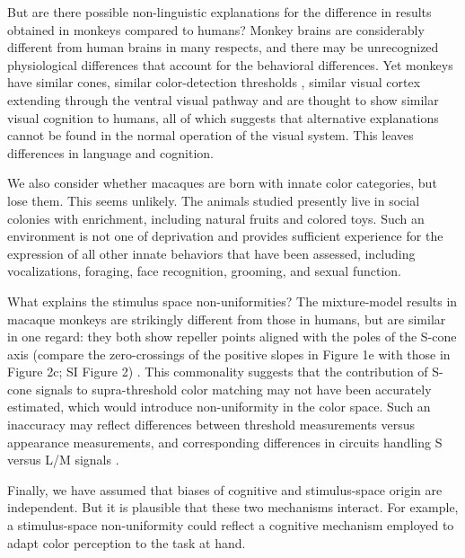 \documentclass[9pt,biorxiv,lineno,onehalfspacing]{lapreprint}
\begin{document}
\begin{refsection}
But are there possible non-linguistic explanations for the difference in results obtained in monkeys compared to humans? 
Monkey brains are considerably different from human brains in many respects, and there may be unrecognized physiological differences that account for the behavioral differences. 
Yet monkeys have similar cones, similar color-detection thresholds \citep{gagin_color-detection_2014,hass_chromatic_2015}, similar visual cortex extending through the ventral visual pathway \cite{lafer-sousa_color-biased_2016,haile_visual_2019} and are thought to show similar visual cognition to humans, all of which suggests that alternative explanations cannot be found in the normal operation of the visual system. This leaves differences in language and cognition. 

We also consider whether macaques are born with innate color categories, but lose them. This seems unlikely. The animals studied presently live in social colonies with enrichment, including natural fruits and colored toys. Such an environment is not one of deprivation and provides sufficient experience for the expression of all other innate behaviors that have been assessed, including vocalizations, foraging, face recognition, grooming, and sexual function. 

What explains the stimulus space non-uniformities? The mixture-model results in macaque monkeys are strikingly different from those in humans, but are similar in one regard: they both show repeller points aligned with the poles of the S-cone axis (compare the zero-crossings of the positive slopes in Figure 1e with those in Figure 2c; SI Figure 2) \citep{skelton_biological_2017,bae_why_2015,panichello_error-correcting_2019}. 
This commonality suggests that the contribution of S-cone signals to supra-threshold color matching may not have been accurately estimated, which would introduce non-uniformity in the color space. 
Such an inaccuracy may reflect differences between threshold measurements versus appearance measurements, and corresponding differences in circuits handling S versus L/M signals \citep{RN655, conway_color_2014}. 

Finally, we have assumed that biases of cognitive and stimulus-space origin are independent. But it is plausible that these two mechanisms interact. For example, a stimulus-space non-uniformity could reflect a cognitive mechanism employed to adapt color perception to the task at hand. 






\end{refsection}
\end{document}
